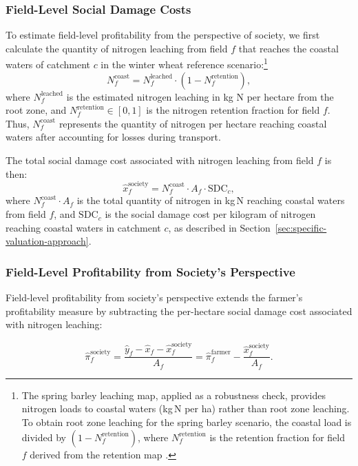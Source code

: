 \documentclass[12pt]{article}
\begin{document}
\subsubsection{Field-Level Social Damage Costs}
To estimate field-level profitability from the perspective of society,
we first calculate the quantity of nitrogen leaching from field $f$
that reaches the coastal waters of catchment
$c$ in the winter wheat reference scenario:\footnote{The spring barley leaching map, applied as a robustness
check, provides nitrogen loads to coastal waters (kg\,N per ha) rather
than root zone leaching. To obtain root zone leaching for the spring
barley scenario, the coastal load is divided by
$(1 - N^{\text{retention}}_f)$, where $N^{\text{retention}}_f$ is the
retention fraction for field $f$ derived from the retention map
\citep{Hojberg2025}.}
\begin{equation}
    N_{f}^{\text{coast}} = N_{f}^{\text{leached}} \cdot
    \left(1 - N_{f}^{\text{retention}}\right),
\end{equation}
where $N_{f}^{\text{leached}}$ is the estimated nitrogen leaching in
kg N per hectare from the root zone, and
$N_{f}^{\text{retention}} \in [0,1]$ is the nitrogen retention
fraction for field $f$.
Thus, $N_{f}^{\text{coast}}$ represents the quantity of nitrogen per
hectare reaching coastal waters after accounting for losses during
transport.

The total social damage cost associated with nitrogen leaching from
field $f$ is then:
\begin{equation}
    \hat{x}_{f}^{\text{society}} = N_f^{\text{coast}} \cdot A_f
    \cdot \text{SDC}_c,
\end{equation}
where $N_{f}^{\text{coast}} \cdot A_f$ is the total quantity of
nitrogen in kg\,N reaching coastal waters from field $f$, and
$\text{SDC}_c$ is the social damage cost per kilogram of nitrogen
reaching coastal waters in catchment $c$, as described in
Section~\ref{sec:specific-valuation-approach}.

\subsubsection{Field-Level Profitability from Society's Perspective}

Field-level profitability from society's perspective extends the farmer's profitability measure by subtracting the per-hectare social damage cost associated with nitrogen leaching:

\begin{equation}
    \hat{\pi}_{f}^{\text{society}} =
    \frac{\hat{y}_{f} - \hat{x}_{f} - \hat{x}_{f}^{\text{society}}}{A_{f}}
    = \hat{\pi}_f^{\text{farmer}} -
    \frac{\hat{x}_{f}^{\text{society}}}{A_{f}}.
\end{equation}
\end{document}
